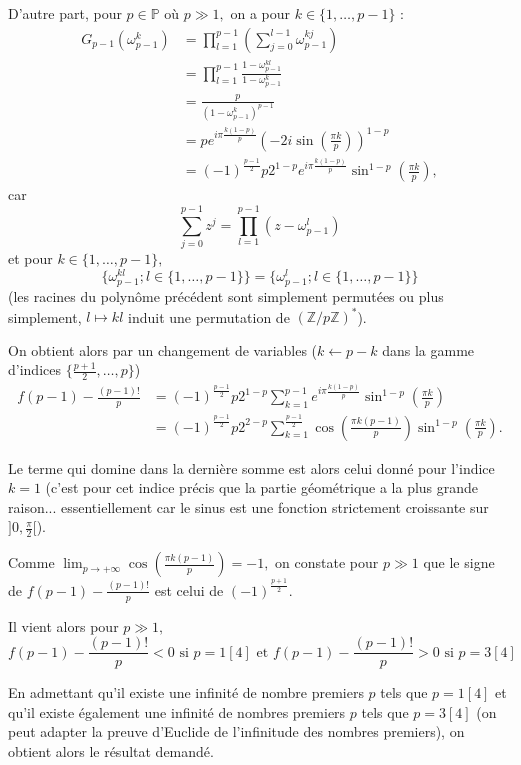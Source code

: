 \begin{enumerate}
D'autre part, pour $p\in \mathbb{P}$ où $p\gg1,$ on a pour $k\in \{1,\ldots,p-1\}$ : 
\begin{align*}
G_{p-1}(\omega_{p-1}^{k}) & = \prod_{l=1}^{p-1}\left(\sum_{j=0}^{l-1}\omega_{p-1}^{kj}\right)\\
& = \prod_{l=1}^{p-1}\frac{1-\omega_{p-1}^{kl}}{1-\omega_{p-1}^{k}}\\
& = \frac{p}{(1-\omega_{p-1}^{k})^{p-1}}\\
& = pe^{i\pi\frac{k(1-p)}{p}}\left( -2i\sin(\frac{\pi k}{p})\right)^{1-p}\\
& = (-1)^{\frac{p-1}{2}}p2^{1-p}e^{i\pi\frac{k(1-p)}{p}}\sin^{1-p}\left(\frac{\pi k}{p}\right),
\end{align*}
car $$\sum_{j=0}^{p-1}z^{j}=\prod_{l=1}^{p-1}(z-\omega_{p-1}^{l})$$ et pour $k\in\{1,\ldots,p-1\},$ $$\{\omega_{p-1}^{kl};l\in\{1,\ldots,p-1\}\}=\{\omega_{p-1}^{l};l\in\{1,\ldots,p-1\}\}$$ (les racines du polynôme précédent sont simplement permutées ou plus simplement, $l \mapsto kl$ induit une permutation de $\left(\mathbb{Z}/p\mathbb{Z}\right)^{*}$).

On obtient alors par un changement de variables ($\displaystyle k\longleftarrow p-k$ dans la gamme d'indices $\displaystyle \{\frac{p+1}{2},\ldots,p\}$)
\begin{align*}
f(p-1)-\frac{(p-1)!}{p} &  = (-1)^{\frac{p-1}{2}}p2^{1-p}\sum_{k=1}^{p-1}e^{i\pi\frac{k(1-p)}{p}}\sin^{1-p}\left(\frac{\pi k}{p}\right)\\
&  = (-1)^{\frac{p-1}{2}}p2^{2-p}\sum_{k=1}^{\frac{p-1}{2}}\cos\left( \frac{\pi k(p-1)}{p}\right)\sin^{1-p}\left(\frac{\pi k}{p}\right).
\end{align*}

Le terme qui domine dans la dernière somme est alors celui donné pour l'indice $k=1$ (c'est pour cet indice précis que la partie géométrique a la plus grande raison... essentiellement car le sinus est une fonction strictement croissante sur $\displaystyle ]0,\frac{\pi}{2}[$).

Comme $\displaystyle \lim_{p\rightarrow +\infty}\cos\left( \frac{\pi k(p-1)}{p}\right)=-1,$ on constate pour $p\gg1$ que le  signe de $\displaystyle f(p-1)-\frac{(p-1)!}{p}$ est celui de $\displaystyle (-1)^{\frac{p+1}{2}}.$

Il vient alors pour $p\gg 1,$ $$f(p-1)-\frac{(p-1)!}{p}<0 \mbox{ si } p=1[4] \mbox{ et } f(p-1)-\frac{(p-1)!}{p}>0 \mbox{ si } p=3[4]$$

En admettant qu'il existe une infinité de nombre premiers $p$ tels que $p=1[4]$ et qu'il existe également une infinité de nombres premiers $p$ tels que $p=3[4]$ (on peut adapter la preuve d'Euclide de l'infinitude des nombres premiers), on obtient alors 
le résultat demandé.
\end{enumerate}


